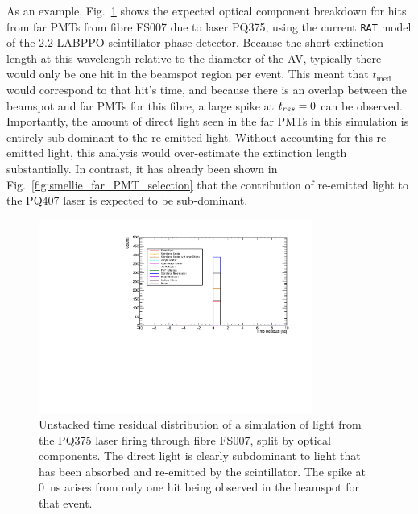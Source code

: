As an example, Fig.~\ref{fig:smellie_PQ375_far_pmts_components} shows the expected optical component breakdown for hits from far PMTs from fibre FS007 due to laser PQ375, using the current \texttt{RAT} model of the \SI{2.2}{\gpl} LABPPO scintillator phase detector. Because the short extinction length at this wavelength relative to the diameter of the AV, typically there would only be one hit in the beamspot region per event. This meant that $t_{\mathrm{med}}$ would correspond to that hit's time, and because there is an overlap between the beamspot and far PMTs for this fibre, a large spike at $t_{res}{} = 0$ can be observed. Importantly, the amount of direct light seen in the far PMTs in this simulation is entirely sub-dominant to the re-emitted light. Without accounting for this re-emitted light, this analysis would over-estimate the extinction length substantially. In contrast, it has already been shown in Fig.~\ref{fig:smellie_far_PMT_selection} that the contribution of re-emitted light to the PQ407 laser is expected to be sub-dominant.

\begin{figure}
    \centering
    \includegraphics[width=0.8\textwidth]{5_SMELLIEAnalysis/images/far_pmts_tres_plot_FS007_PQ375.pdf}
    \caption[Unstacked time residual distribution of a simulation of light from the PQ375 laser firing through fibre FS007, split by optical components]
    {Unstacked time residual distribution of a simulation of light from the PQ375 laser firing through fibre FS007, split by optical components. The direct light is clearly subdominant to light that has been absorbed and re-emitted by the scintillator. The spike at \SI{0}{\ns} arises from only one hit being observed in the beamspot for that event.}
    \label{fig:smellie_PQ375_far_pmts_components}
\end{figure}

